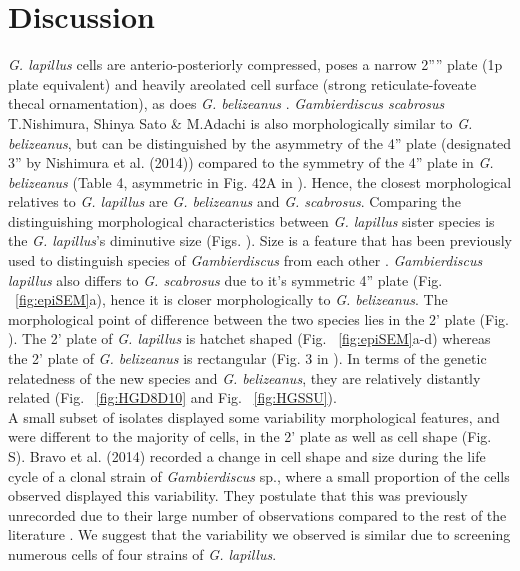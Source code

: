 \documentclass[12pt]{article}
\begin{document}
\newpage
\section{Discussion}
\emph{G. lapillus} cells are anterio-posteriorly compressed, poses a narrow 2'''' plate (1p plate equivalent) and heavily areolated cell surface (strong reticulate-foveate thecal ornamentation), as does \emph{G. belizeanus}  \citep{litaker2009taxonomy}.
 \emph{Gambierdiscus scabrosus} T.Nishimura, Shinya Sato \& M.Adachi is also morphologically similar to \emph{G. belizeanus}, but can be distinguished by the asymmetry of the 4'' plate (designated 3'' by Nishimura et al. (2014)) compared to the symmetry of the 4'' plate in \emph{G. belizeanus} (Table 4, asymmetric in Fig. 42A in \citep{hoppenrath2014marine}). 
 Hence, the closest morphological relatives to \emph{G. lapillus} are \emph{G. belizeanus} and \emph{G. scabrosus}. 
Comparing the distinguishing morphological characteristics between \emph{G. lapillus} sister species is the \textit{G. lapillus}'s diminutive size (Figs. ). %
 Size is a feature that has been previously used to distinguish species of \emph{Gambierdiscus} from each other \citep{litaker2009taxonomy}. 
\emph{Gambierdiscus lapillus} also differs to \emph{G. scabrosus} due to it's symmetric 4'' plate (Fig. ~\ref{fig:epiSEM}a), hence it is closer morphologically to \emph{G. belizeanus}. %
The morphological point of difference between the two species lies in the 2' plate (Fig. ). %
The 2' plate of \emph{G. lapillus} is hatchet shaped (Fig. ~\ref{fig:epiSEM}a-d) whereas the 2' plate of \emph{G. belizeanus} is rectangular (Fig. 3 in \citep{faust1995observation}). %
In terms of the genetic relatedness of the new species and \textit{G. belizeanus}, they are relatively distantly related (Fig. ~\ref{fig:HGD8D10} and Fig. ~\ref{fig:HGSSU}). \\
A small subset of isolates displayed some variability morphological features, and were different to the majority of cells, in the 2' plate as well as cell shape (Fig. S). %
Bravo et al. (2014) recorded a change in cell shape and size during the life cycle of a clonal strain of \emph{Gambierdiscus} sp., where a small proportion of the cells observed displayed this variability. 
They postulate that this was previously unrecorded due to their large number of observations compared to the rest of the literature \citep{bravo2014cellular}. 
We suggest that the variability we observed is similar due to screening numerous cells of four strains of \emph{G. lapillus}. 
\end{document}
